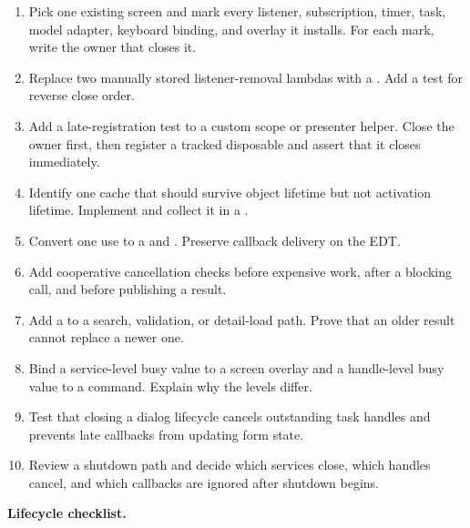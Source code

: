 \begin{exercisebox}
\begin{enumerate}
\item Pick one existing screen and mark every listener, subscription, timer,
task, model adapter, keyboard binding, and overlay it installs. For each mark,
write the owner that closes it.
\item Replace two manually stored listener-removal lambdas with a
. Add a test for reverse close order.
\item Add a late-registration test to a custom scope or presenter helper. Close
the owner first, then register a tracked disposable and assert that it closes
immediately.
\item Identify one cache that should survive object lifetime but not activation
lifetime. Implement  and collect it in a .
\item Convert one  use to a  and
. Preserve callback delivery on the EDT.
\item Add cooperative cancellation checks before expensive work, after a
blocking call, and before publishing a result.
\item Add a  to a search, validation, or detail-load
path. Prove that an older result cannot replace a newer one.
\item Bind a service-level busy value to a screen overlay and a handle-level
busy value to a command. Explain why the levels differ.
\item Test that closing a dialog lifecycle cancels outstanding task handles and
prevents late callbacks from updating form state.
\item Review a shutdown path and decide which services close, which handles
cancel, and which callbacks are ignored after shutdown begins.
\end{enumerate}
\end{exercisebox}

\begin{center}
\textbf{Lifecycle checklist.}
\end{center}

